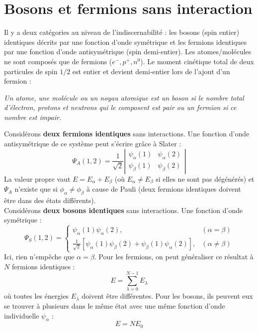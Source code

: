 \documentclass	[11pt, a4paper, openany]{book}
\begin{document}
		\section{Bosons et fermions sans interaction}
		Il y a deux catégories au niveau de l'indiscernabilité : les bosons (spin entier) identiques décrits par 
		une fonction d'onde symétrique et les fermions identiques par une fonction d'onde antisymétrique (spin 
		demi-entier). Les atomes/molécules ne sont composés que de fermions ($e^-,p^+,n^0$). Le moment cinétique
		total de deux particules de spin $1/2$ est entier et devient demi-entier lors de l'ajout d'un fermion :
		\begin{center}
			\textit{Un atome, une molécule ou un noyau atomique est un boson si le nombre total d'électron, protons 
			et neutrons qui le composent est pair ou un fermion si ce nombre est impair.}
		\end{center}
		Considérons \textbf{deux fermions identiques} sans interactions. Une fonction d'onde antisymétrique de
		ce système peut s'écrire grâce à Slater :
		\begin{equation}
			\Psi_A(1,2) = \frac{1}{\sqrt{2}}\left|\begin{array}{cc}
			\psi_\alpha(1) & \psi_\alpha(2)\\
			\psi_\beta(1) & \psi_\beta(2)
			\end{array}\right|
		\end{equation}
		La valeur propre vaut $E = E_\alpha + E_\beta$ (où $E_\alpha \neq E_\beta$ si elles ne sont pas dégénérés) 
		et $\Psi_A$ n'existe que si $\phi_\alpha\neq\phi_\beta$ à cause de Pauli (deux fermions identiques doivent 
		être dans des états différents).\\
		Considérons \textbf{deux bosons identiques} sans interactions. Une fonction d'onde symétrique :
		\begin{equation}
			\Psi_S(1,2) = \left\{\begin{array}{ll}
			\psi_\alpha(1)\psi_\alpha(2), & (\alpha=\beta)\\
			\frac{1}{\sqrt{2}}[\psi_\alpha(1)\psi_\beta(2) + \psi_\beta(1)\psi_\alpha(2)], & (\alpha\neq\beta)
			\end{array}\right.
		\end{equation}
		Ici, rien n'empêche que $\alpha = \beta$. Pour les fermions, on peut généraliser ce résultat à $N$ fermions 
		identiques :
		\begin{equation}
			E = \sum_{\lambda=0}^{N-1} E_\lambda
		\end{equation}
		où toutes les énergies $E_\lambda$ doivent être différentes. Pour les bosons, ils peuvent eux se trouver
		à plusieurs dans le même état avec une même fonction d'onde individuelle $\psi_\alpha$ :
		\begin{equation}
			E = NE_0
		\end{equation}
		
\end{document}
